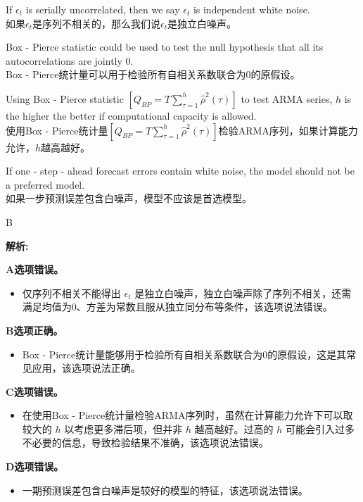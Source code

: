 \documentclass{article}
\newenvironment{explanation}
{\textbf{解析:}\par}
{\par}
\begin{document}
    \begin{choices}
        \item If \(\epsilon_t\) is serially uncorrelated, then we say \(\epsilon_t\) is independent white noise.\\
        如果\(\epsilon_t\)是序列不相关的，那么我们说\(\epsilon_t\)是独立白噪声。
        \item Box - Pierce statistic could be used to test the null hypothesis that all its autocorrelations are jointly 0.\\
        Box - Pierce统计量可以用于检验所有自相关系数联合为0的原假设。
        \item Using Box - Pierce statistic \([Q_{BP}=T\sum_{\tau = 1}^{h}\hat{\rho}^{2}(\tau)]\) to test ARMA series, \(h\) is the higher the better if computational capacity is allowed.\\
        使用Box - Pierce统计量\([Q_{BP}=T\sum_{\tau = 1}^{h}\hat{\rho}^{2}(\tau)]\)检验ARMA序列，如果计算能力允许，\(h\)越高越好。
        \item If one - step - ahead forecast errors contain white noise, the model should not be a preferred model.\\
        如果一步预测误差包含白噪声，模型不应该是首选模型。
    \end{choices}
    
    \begin{correctanswer}
    B
    \end{correctanswer}
    
    \begin{explanation}
    \textbf{A选项错误。}
    \begin{itemize}
    \item 仅序列不相关不能得出 \(\epsilon_t\) 是独立白噪声，独立白噪声除了序列不相关，还需满足均值为0、方差为常数且服从独立同分布等条件，该选项说法错误。
    \end{itemize}
    \textbf{B选项正确。}
    \begin{itemize}
    \item Box - Pierce统计量能够用于检验所有自相关系数联合为0的原假设，这是其常见应用，该选项说法正确。
    \end{itemize}
    \textbf{C选项错误。}
    \begin{itemize}
    \item 在使用Box - Pierce统计量检验ARMA序列时，虽然在计算能力允许下可以取较大的 \(h\) 以考虑更多滞后项，但并非 \(h\) 越高越好。过高的 \(h\) 可能会引入过多不必要的信息，导致检验结果不准确，该选项说法错误。
    \end{itemize}
    \textbf{D选项错误。}
    \begin{itemize}
    \item 一期预测误差包含白噪声是较好的模型的特征，该选项说法错误。
    \end{itemize}
    \end{explanation}
    
\end{document}
